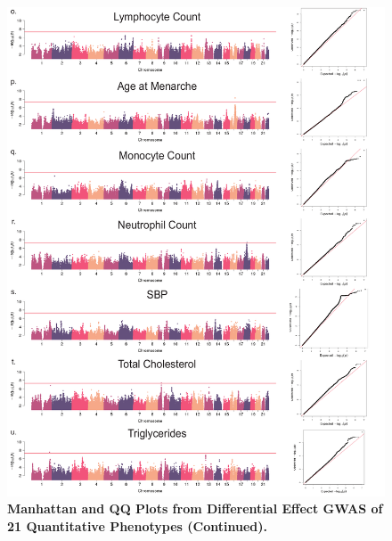 \begin{figure}[!htb]
	\ContinuedFloat
	\centering
	\includegraphics[width=5in]{img/ch02/fig-s7c.pdf}
	\caption[Manhattan and QQ Plots from Differential Effect GWAS of 21 Quantitative Phenotypes (Continued). ]{\textbf{Manhattan and QQ Plots from Differential Effect GWAS of 21 Quantitative Phenotypes (Continued).} }
	\label{fig:fig-s7c}
\end{figure}


